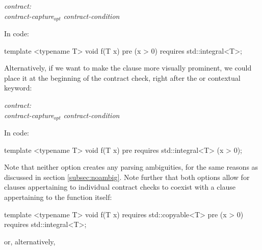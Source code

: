 \begin{adjustwidth}{0.5cm}{0.5cm}
\emph{contract:} \\
\phantom{~~~}\emph{contract-capture}$_{opt}$ \emph{contract-condition} 

\end{adjustwidth}

In code:

\begin{codeblock}
template <typename T>
void f(T x)
  pre (x > 0) requires std::integral<T>;
\end{codeblock}

Alternatively, if we want to make the  clause more visually prominent, we could place it at the beginning of the contract check, right after the  or  contextual keyword:

\begin{adjustwidth}{0.5cm}{0.5cm}

\emph{contract:} \\
\phantom{~~~} \emph{contract-capture}$_{opt}$ \emph{contract-condition}

\end{adjustwidth}

In code:

\begin{codeblock}
template <typename T>
void f(T x)
  pre requires std::integral<T> (x > 0);
\end{codeblock}

Note that neither option creates any parsing ambiguities, for the same reasons as discussed in section \ref{subsec:noambig}. Note further that both options allow for  clauses appertaining to individual contract checks to coexist with a  clause appertaining to the function itself:

\begin{codeblock}
template <typename T>
void f(T x)
  requires std::copyable<T>
  pre (x > 0) requires std::integral<T>;
\end{codeblock}

or, alternatively,

